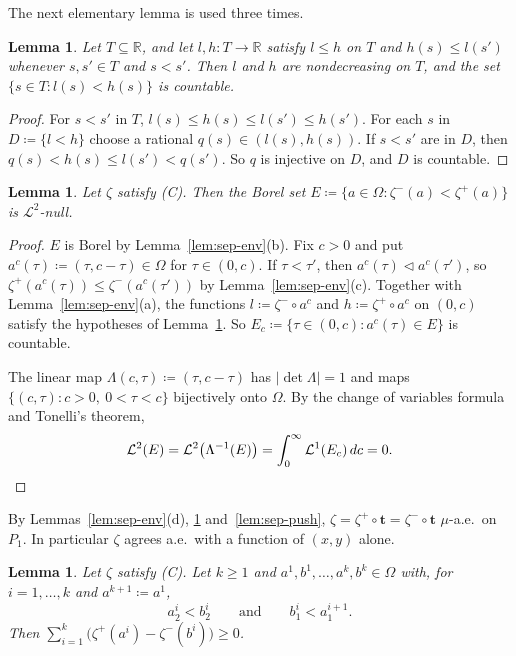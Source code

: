 \documentclass[11pt]{article}
\newtheorem{lemma}[theorem]{Lemma}
\theoremstyle{definition}\newtheorem{definition}[theorem]{Definition}
\theoremstyle{remark}\newtheorem{remark}[theorem]{Remark}
\begin{document}
The next elementary lemma is used three times.

\begin{lemma}\label{lem:sep-interleave}
Let $T\subseteq\mathbb R$, and let $l,h\colon T\to\mathbb R$ satisfy $l\le h$
on $T$ and $h(s)\le l(s')$ whenever $s,s'\in T$ and $s<s'$. Then $l$ and $h$
are nondecreasing on $T$, and the set $\{s\in T:l(s)<h(s)\}$ is countable.
\end{lemma}

\begin{proof}
For $s<s'$ in $T$, $l(s)\le h(s)\le l(s')\le h(s')$. For each $s$ in
$D\coloneqq\{l<h\}$ choose a rational $q(s)\in(l(s),h(s))$. If $s<s'$ are in
$D$, then $q(s)<h(s)\le l(s')<q(s')$. So $q$ is injective on $D$, and $D$
is countable.
\end{proof}

\begin{lemma}\label{lem:sep-diag}
Let $\zeta$ satisfy (C). Then the Borel set
$E\coloneqq\{a\in\Omega:\zeta^-(a)<\zeta^+(a)\}$ is $\mathcal L^2$-null.
\end{lemma}

\begin{proof}
$E$ is Borel by Lemma~\ref{lem:sep-env}(b). Fix $c>0$ and put
$a^c(\tau)\coloneqq(\tau,c-\tau)\in\Omega$ for $\tau\in(0,c)$. If
$\tau<\tau'$, then $a^c(\tau)\lhd a^c(\tau')$, so
$\zeta^+(a^c(\tau))\le\zeta^-(a^c(\tau'))$ by Lemma~\ref{lem:sep-env}(c).
Together with Lemma~\ref{lem:sep-env}(a), the functions
$l\coloneqq\zeta^-\circ a^c$ and $h\coloneqq\zeta^+\circ a^c$ on $(0,c)$
satisfy the hypotheses of Lemma~\ref{lem:sep-interleave}. So
$E_c\coloneqq\{\tau\in(0,c):a^c(\tau)\in E\}$ is countable.

The linear map $\Lambda(c,\tau)\coloneqq(\tau,c-\tau)$ has $|\det\Lambda|=1$
and maps $\{(c,\tau):c>0,\ 0<\tau<c\}$ bijectively onto $\Omega$. By the
change of variables formula and Tonelli's theorem,
\[
 \mathcal L^2(E)=\mathcal L^2\bigl(\Lambda^{-1}(E)\bigr)
 =\int_0^\infty\mathcal L^1(E_c)\,dc=0 .
\qedhere
\]
\end{proof}

By Lemmas~\ref{lem:sep-env}(d), \ref{lem:sep-diag} and~\ref{lem:sep-push},
$\zeta=\zeta^+\circ\mathbf t=\zeta^-\circ\mathbf t$ $\mu$-a.e.\ on $P_1$. In
particular $\zeta$ agrees a.e.\ with a function of $(x,y)$ alone.

\begin{lemma}\label{lem:sep-points}
Let $\zeta$ satisfy (C). Let $k\ge1$ and
$a^1,b^1,\dots,a^k,b^k\in\Omega$ with, for $i=1,\dots,k$ and
$a^{k+1}\coloneqq a^1$,
\[
 a^i_2<b^i_2\qquad\text{and}\qquad b^i_1<a^{i+1}_1 .
\]
Then $\sum_{i=1}^k\bigl(\zeta^+(a^i)-\zeta^-(b^i)\bigr)\ge0$.
\end{lemma}
\end{document}

